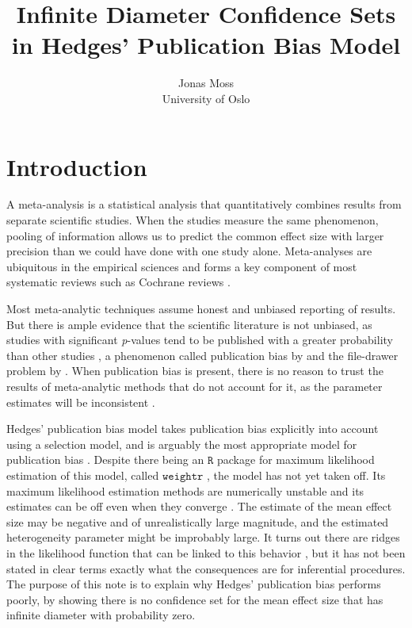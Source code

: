 \documentclass[article]{ajs}
\author{Jonas Moss \\ University of Oslo}
\title{Infinite Diameter Confidence Sets in Hedges' Publication Bias Model}
\numberwithin{equation}{section}
\numberwithin{figure}{section}
\theoremstyle{plain}
\theoremstyle{definition}
\theoremstyle{definition}
\theoremstyle{plain}
\begin{document}
\section{Introduction}

A meta-analysis is a statistical analysis that quantitatively combines
results from separate scientific studies. When the studies measure
the same phenomenon, pooling of information allows us to predict the
common effect size with larger precision than we could have done with
one study alone. Meta-analyses are ubiquitous in the empirical sciences
and forms a key component of most systematic reviews such as Cochrane
reviews \citep{Higgins2019-vv}.

Most meta-analytic techniques assume honest and unbiased reporting
of results. But there is ample evidence that the scientific literature
is not unbiased, as studies with\emph{ }significant \textit{p}-values
tend to be published with a greater probability than other studies
\citep{Easterbrook1991-ph}, a phenomenon called publication bias
by \citet{sterling1959publication} and the file-drawer problem by
\citet{Rosenthal1979-pm}. When publication bias is present, there
is no reason to trust the results of meta-analytic methods that do
not account for it, as the parameter estimates will be inconsistent
\citep{Carter2019-rw}. 

Hedges' \citeyearpar{hedges1992modeling} publication bias model takes publication bias explicitly into account using a selection model, and is arguably the most appropriate model for publication bias \citep{Carter2019-rw}. Despite there being an $\mathtt{R}$ \citep{Team2013-tt} package for maximum likelihood estimation of this model, called $\texttt{weightr}$ \citep{Coburn2019-ec}, the model has not yet taken off. Its maximum likelihood estimation methods are numerically unstable and its estimates can be off even when they converge \citep{Coburn2019-ec,Stanley2005-ng}. The estimate of the mean effect size may be negative and of unrealistically large magnitude, and the estimated heterogeneity parameter might be improbably large. It turns out there are ridges in the likelihood function that can be linked to this behavior \citep{McShane2016-rb}, but it has not been stated in clear terms exactly what the consequences are for inferential procedures. The purpose of this note is to explain why Hedges' publication bias performs poorly, by showing there is no confidence set for the mean effect size that has infinite diameter with probability zero. %
\end{document}
